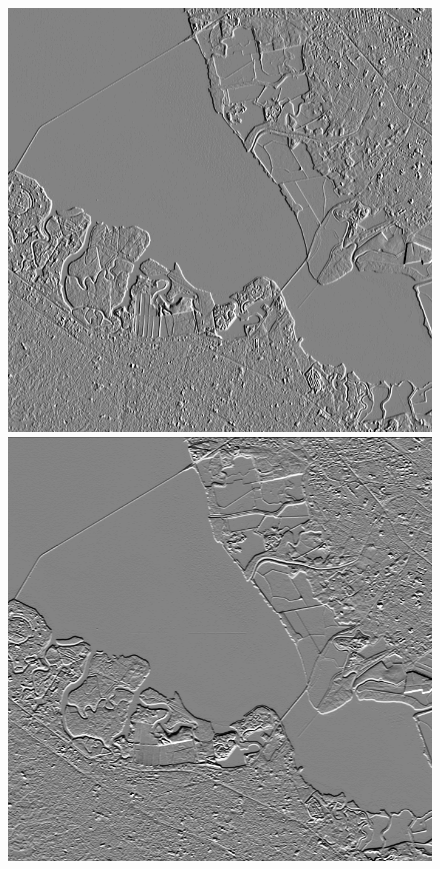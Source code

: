 \documentclass[12pt]{article}
\begin{document}
\begin{figure}[h!]
    \centering
    \includegraphics[width=.48\linewidth]{figures/p8/aster_vertical.png}
    \includegraphics[width=.48\linewidth]{figures/p8/aster_horizontal.png}


\end{figure}
\end{document}
